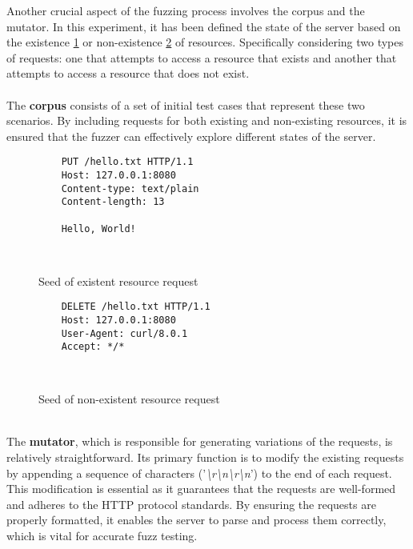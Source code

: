 Another crucial aspect of the fuzzing process involves the corpus and the mutator. In this experiment, it has been defined the state of the server based on the existence \ref{tab:existent_resource} or non-existence \ref{tab:nonexistent_resource} of resources. Specifically considering two types of requests: one that attempts to access a resource that exists and another that attempts to access a resource that does not exist.
\\\\The \textbf{corpus} consists of a set of initial test cases that represent these two scenarios. By including requests for both existing and non-existing resources, it is ensured that the fuzzer can effectively explore different states of the server.
\begin{figure}[H]
    \centering
    \begin{adjustbox}{valign=t}
    \begin{lstlisting}
    PUT /hello.txt HTTP/1.1
    Host: 127.0.0.1:8080
    Content-type: text/plain
    Content-length: 13

    Hello, World!

    
    \end{lstlisting}
    \end{adjustbox}
    \caption{Seed of existent resource request}
    \label{tab:existent_resource}
\end{figure}
    
\begin{figure}[H]
    \centering
    \begin{adjustbox}{valign=t}
    \begin{lstlisting}
    DELETE /hello.txt HTTP/1.1
    Host: 127.0.0.1:8080
    User-Agent: curl/8.0.1
    Accept: */*

    
    \end{lstlisting}
    \end{adjustbox}
    \caption{Seed of non-existent resource request}
    \label{tab:nonexistent_resource}
\end{figure}
\phantom{}\\
The \textbf{mutator}, which is responsible for generating variations of the requests, is relatively straightforward. Its primary function is to modify the existing requests by appending a sequence of characters ('\textit{\textbackslash r\textbackslash n\textbackslash r\textbackslash n}') to the end of each request. This modification is essential as it guarantees that the requests are well-formed and adheres to the HTTP protocol standards. By ensuring the requests are properly formatted, it enables the server to parse and process them correctly, which is vital for accurate fuzz testing.

